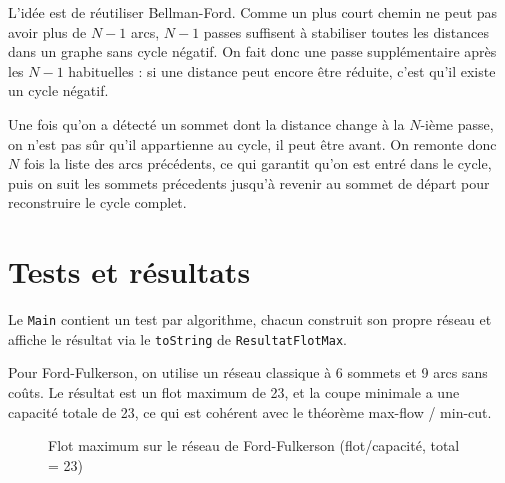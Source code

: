 \documentclass[11pt,a4paper]{article}
\begin{document}
L'idée est de réutiliser Bellman-Ford. Comme un plus court chemin ne peut pas avoir plus de $N-1$ arcs, $N-1$ passes suffisent à stabiliser toutes les distances dans un graphe sans cycle négatif. On fait donc une passe supplémentaire après les $N-1$ habituelles : si une distance peut encore être réduite, c'est qu'il existe un cycle négatif.

Une fois qu'on a détecté un sommet dont la distance change à la $N$-ième passe, on n'est pas sûr qu'il appartienne au cycle, il peut être avant. On remonte donc $N$ fois la liste des arcs précédents, ce qui garantit qu'on est entré dans le cycle, puis on suit les sommets précedents jusqu'à revenir au sommet de départ pour reconstruire le cycle complet.


\section{Tests et résultats}

Le \texttt{Main} contient un test par algorithme, chacun construit son propre réseau et affiche le résultat via le \texttt{toString} de \texttt{ResultatFlotMax}.

\medskip
Pour Ford-Fulkerson, on utilise un réseau classique à 6 sommets et 9 arcs sans coûts. Le résultat est un flot maximum de 23, et la coupe minimale a une capacité totale de 23, ce qui est cohérent avec le théorème max-flow / min-cut.

\begin{figure}[h]
    \centering
    \caption{Flot maximum sur le réseau de Ford-Fulkerson (flot/capacité, total = 23)}
\end{figure}
\end{document}
